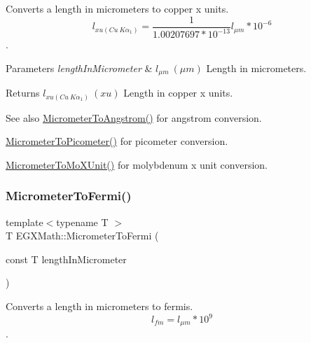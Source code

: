 Converts a length in micrometers to copper x units. \[ l_{xu(Cu\ K\alpha_1)}= \frac{1}{1.00207697*10^{-13}} l_{\mu m} * 10^{-6}\]. 


\begin{DoxyParams}{Parameters}
{\em length\+In\+Micrometer} & $ l_{\mu m}\ (\mu m)$ Length in micrometers. \\
\hline
\end{DoxyParams}
\begin{DoxyReturn}{Returns}
$ l_{xu(Cu\ K\alpha_1)}\ (xu)$ Length in copper x units. 
\end{DoxyReturn}
\begin{DoxySeeAlso}{See also}
\mbox{\hyperlink{group___e_g_x_math-_conversions-_length_conversions-_s_i-_micrometer-_non-_s_i_ga4b7df35169682046455e9a6f99447777}{Micrometer\+To\+Angstrom()}} for angstrom conversion. 

\mbox{\hyperlink{group___e_g_x_math-_conversions-_length_conversions-_s_i-_micrometer-_s_i_ga912ed4989391eeb5d25f43e99108502e}{Micrometer\+To\+Picometer()}} for picometer conversion. 

\mbox{\hyperlink{group___e_g_x_math-_conversions-_length_conversions-_s_i-_micrometer-_non-_s_i_ga2ed475ce56e23d7783d6925f5b409f44}{Micrometer\+To\+Mo\+X\+Unit()}} for molybdenum x unit conversion. 
\end{DoxySeeAlso}
\mbox{\label{group___e_g_x_math-_conversions-_length_conversions-_s_i-_micrometer-_non-_s_i_ga23f5f429bc4df952e3d874fb944bd1ce}} 
\subsubsection{\texorpdfstring{Micrometer\+To\+Fermi()}{MicrometerToFermi()}}
{\footnotesize\ttfamily template$<$typename T $>$ \\
T E\+G\+X\+Math\+::\+Micrometer\+To\+Fermi (\begin{DoxyParamCaption}\item[{const T}]{length\+In\+Micrometer }\end{DoxyParamCaption})}



Converts a length in micrometers to fermis. \[ l_{fm}=l_{\mu m} * 10^{9} \]. 


